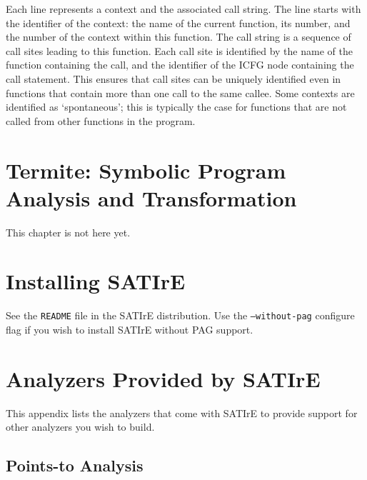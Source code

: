 \documentclass[a4paper,12pt]{report}
\begin{document}
Each line represents a context and the associated call string. The line
starts with the identifier of the context: the name of the current function,
its number, and the number of the context within this function. The call
string is a sequence of call sites leading to this function. Each call site
is identified by the name of the function containing the call, and the
identifier of the ICFG node containing the call statement. This ensures that
call sites can be uniquely identified even in functions that contain more
than one call to the same callee. Some contexts are identified as
`spontaneous'; this is typically the case for functions that are not called
from other functions in the program.

\chapter{Termite: Symbolic Program Analysis and Transformation}
\label{chap:termite}

This chapter is not here yet.

\appendix

\chapter{Installing SATIrE}
\label{appendix:installing}

See the \texttt{README} file in the SATIrE distribution. Use the
\texttt{--without-pag} configure flag if you wish to install SATIrE without
PAG support.

\chapter{Analyzers Provided by SATIrE}
\label{appendix:analyzers}

This appendix lists the analyzers that come with SATIrE to provide support
for other analyzers you wish to build.

\section{Points-to Analysis}
\label{sec:analysis_pointsto}
\end{document}
